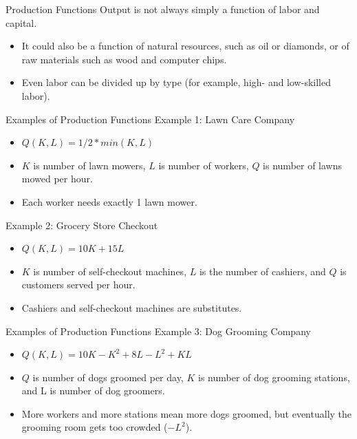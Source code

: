 \documentclass[11pt,t]{beamer}
\begin{document}
\begin{frame}{Production Functions}
  Output is not always simply a function of labor and capital.
  
  \bigskip
  \begin{itemize}
    \item It could also be a function of natural resources, such as oil or diamonds, or of raw materials such as wood and computer chips.

    \item Even labor can be divided up by type (for example, high- and low-skilled labor).
  \end{itemize}
\end{frame}

\begin{frame}{Examples of Production Functions}
  Example 1: Lawn Care Company

  \begin{itemize}
    \item $Q(K,L) = 1/2 * min(K,L)$
    \item $K$ is number of lawn mowers, $L$ is number of workers, $Q$ is number of lawns mowed per hour.
    \item Each worker needs exactly 1 lawn mower.
  \end{itemize}

  \bigskip
  Example 2: Grocery Store Checkout

  \begin{itemize}
    \item $Q(K,L) = 10K + 15L$
    \item $K$ is number of self-checkout machines, $L$ is the number of cashiers, and $Q$ is customers served per hour.
    \item Cashiers and self-checkout machines are substitutes.
  \end{itemize}
\end{frame}

\begin{frame}{Examples of Production Functions}
  Example 3: Dog Grooming Company

  \begin{itemize}
    \item $Q(K,L) = 10K - K^2 + 8L - L^2 + KL$
    \item $Q$ is number of dogs groomed per day, $K$ is number of dog grooming stations, and L is number of dog groomers.
    \item More workers and more stations mean more dogs groomed, but eventually the grooming room gets too crowded ($-L^2$).
  \end{itemize}
\end{frame}
\end{document}
